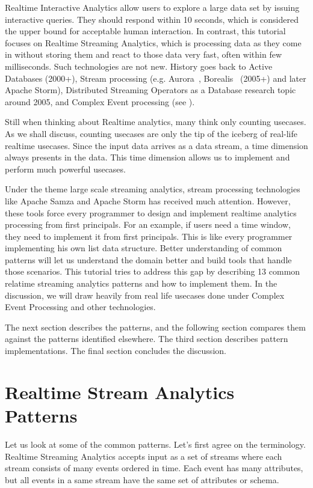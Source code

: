 \documentclass{sig-alternate}
\begin{document}
Realtime Interactive Analytics allow users to explore a large data set by issuing interactive queries. They should respond within 10 seconds, which is considered the upper bound for acceptable human interaction. In contrast, this tutorial focuses on Realtime Streaming Analytics, which is processing data as they come in without storing them and react to those data very fast, often within few milliseconds. Such technologies are not new. History goes back to Active Databases (2000+), Stream processing (e.g. Aurora~\cite{abadi_aurora:_2003}, Borealis~\cite{abadi_design_2005} (2005+) and later Apache Storm), Distributed Streaming Operators as a Database research topic around 2005, and Complex Event processing (see \cite{marketSurvey}).

Still when thinking about Realtime analytics, many think only counting usecases. As we shall discuss, counting usecases are only the tip of the iceberg of real-life realtime usecases. Since the input data arrives as a data stream, a time dimension always presents in the data. This time dimension allows us to implement and perform much powerful usecases.  

Under the theme large scale streaming analytics, stream processing technologies like Apache Samza and Apache Storm has received much attention. However, these tools force every programmer to design and implement realtime analytics processing from first principals. For an example, if users need a time window, they need to implement it from first principals.  This is like every programmer implementing his own list data structure. Better understanding of common patterns will let us understand the domain better and build tools that handle those scenarios. This tutorial tries to address this gap by describing 13 common relatime streaming analytics patterns and how to implement them. In the discussion, we will draw heavily from real life usecases done under Complex Event Processing and other technologies. 

The next section describes the patterns, and the following  section compares them against the patterns identified elsewhere. The third section describes pattern implementations. The final section concludes the discussion. 

\section{Realtime Stream Analytics Patterns}
 
Let us look at some of the common patterns. Let's first agree on the terminology. Realtime Streaming Analytics accepts input as a set of streams where each stream consists of many events ordered in time. Each event has many attributes, but all events in a same stream have the same set of attributes or schema. 
\end{document}
